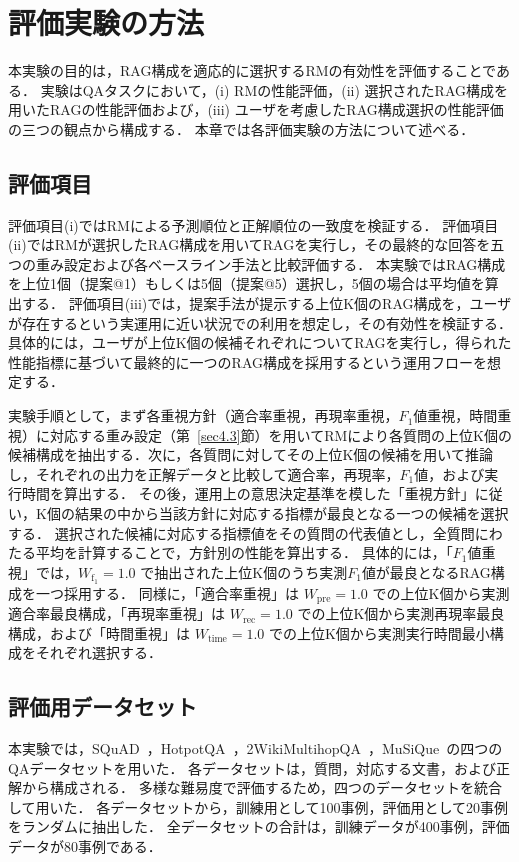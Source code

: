\section{評価実験の方法} \label{sec4}
本実験の目的は，RAG構成を適応的に選択するRMの有効性を評価することである．
実験はQAタスクにおいて，(i) RMの性能評価，(ii) 選択されたRAG構成を用いたRAGの性能評価および，(iii) ユーザを考慮したRAG構成選択の性能評価の三つの観点から構成する．
本章では各評価実験の方法について述べる．

\subsection{評価項目} \label{sec4.0}
評価項目(i)ではRMによる予測順位と正解順位の一致度を検証する．
評価項目(ii)ではRMが選択したRAG構成を用いてRAGを実行し，その最終的な回答を五つの重み設定および各ベースライン手法と比較評価する．
本実験ではRAG構成を上位1個（提案@1）もしくは5個（提案@5）選択し，5個の場合は平均値を算出する．
評価項目(iii)では，提案手法が提示する上位K個のRAG構成を，ユーザが存在するという実運用に近い状況での利用を想定し，その有効性を検証する．
具体的には，ユーザが上位K個の候補それぞれについてRAGを実行し，得られた性能指標に基づいて最終的に一つのRAG構成を採用するという運用フローを想定する．

実験手順として，まず各重視方針（適合率重視，再現率重視，$F_1$値重視，時間重視）に対応する重み設定（第~\ref{sec4.3}節）を用いてRMにより各質問の上位K個の候補構成を抽出する．次に，各質問に対してその上位K個の候補を用いて推論し，それぞれの出力を正解データと比較して適合率，再現率，$F_1$値，および実行時間を算出する．
その後，運用上の意思決定基準を模した「重視方針」に従い，K個の結果の中から当該方針に対応する指標が最良となる一つの候補を選択する．
選択された候補に対応する指標値をその質問の代表値とし，全質問にわたる平均を計算することで，方針別の性能を算出する．
具体的には，「$F_1$値重視」では，$W_{\mathrm{f_1}}=1.0$ で抽出された上位K個のうち実測$F_1$値が最良となるRAG構成を一つ採用する．
同様に，「適合率重視」は $W_{\mathrm{pre}}=1.0$ での上位K個から実測適合率最良構成，「再現率重視」は $W_{\mathrm{rec}}=1.0$ での上位K個から実測再現率最良構成，および「時間重視」は $W_{\mathrm{time}}=1.0$ での上位K個から実測実行時間最小構成をそれぞれ選択する．

\subsection{評価用データセット} \label{sec4.1}
本実験では，SQuAD~\cite{rajpurkar16}，HotpotQA~\cite{yang18}，2WikiMultihopQA~\cite{ho20}，MuSiQue~\cite{trivedi22}の四つのQAデータセットを用いた．
各データセットは，質問，対応する文書，および正解から構成される．
多様な難易度で評価するため，四つのデータセットを統合して用いた．
各データセットから，訓練用として100事例，評価用として20事例をランダムに抽出した．
全データセットの合計は，訓練データが400事例，評価データが80事例である．

